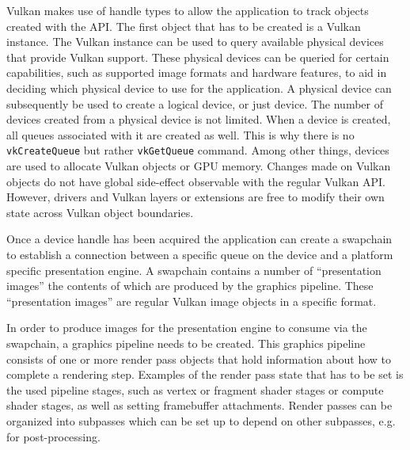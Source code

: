     Vulkan makes use of handle types to allow the \gls{application} to track objects created with the API. The first object that has to be created is a Vulkan instance. The Vulkan instance can be used to query available physical \glspl{device} that provide Vulkan support. These physical \glspl{device} can be queried for certain capabilities, such as supported image formats and hardware features, to aid in deciding which physical device to use for the \gls{application}. A physical device can subsequently be used to create a logical device, or just device. The number of \glspl{device} created from a physical device is not limited. When a device is created, all queues associated with it are created as well. This is why there is no \lstinline{vkCreateQueue} but rather \lstinline{vkGetQueue} command. Among other things, \glspl{device} are used to allocate Vulkan objects or GPU memory. Changes made on Vulkan objects do not have global side-effect observable with the regular Vulkan API. However, \glspl{driver} and Vulkan layers or extensions are free to modify their own state across Vulkan object boundaries.

    \begin{figure}
      \caption{}
      \centering
      \label{fig:VulkanInitialization}
    \end{figure}


    Once a device handle has been acquired the \gls{application} can create a swapchain to establish a connection between a specific queue on the device and a platform specific presentation engine. A swapchain contains a number of ``presentation images'' the contents of which are produced by the graphics pipeline. These ``presentation images'' are regular Vulkan image objects in a specific format.

    In order to produce images for the presentation engine to consume via the swapchain, a graphics pipeline needs to be created. This graphics pipeline consists of one or more render pass objects that hold information about how to complete a rendering step. Examples of the render pass state that has to be set is the used pipeline stages, such as vertex or fragment shader stages or compute shader stages, as well as setting framebuffer attachments. Render passes can be organized into subpasses which can be set up to depend on other subpasses, e.g. for post-processing.

